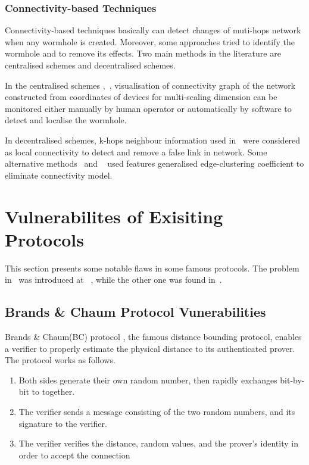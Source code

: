 \subsubsection*{Connectivity-based Techniques}

Connectivity-based techniques basically can detect changes of muti-hops network when any wormhole is created. Moreover, some approaches tried to identify the wormhole and to remove its effects. Two main methods in the literature are centralised schemes and decentralised schemes. 

In the centralised schemes \cite{RuiZhang2010},~\cite{WeichaoWang2007}, visualisation of connectivity graph of the network constructed from coordinates of devices for multi-scaling dimension can be monitored either manually by human operator or automatically by software to detect and localise the wormhole. 

In decentralised schemes, k-hops neighbour information used in~\cite{RiteshMaheshwari}\cite{4699583} were considered as local connectivity to detect and remove a false link in network. Some alternative methods~\cite{RiteshMaheshwari} and ~\cite{5993472} used features generalised edge-clustering coefficient to eliminate connectivity model.

\section{Vulnerabilites of Exisiting Protocols}

This section presents some notable flaws in some famous protocols. The problem in~\cite{Brands:1994aa} was introduced at ~\cite{6234408}, while the other one was found in~\cite{lin2006}. 

\subsection{Brands \& Chaum Protocol Vunerabilities}

Brands \& Chaum(BC) protocol \cite{Brands:1994aa}, the famous distance bounding protocol, enables a verifier to properly estimate the physical distance to its authenticated prover. The protocol works as follows.
\begin{enumerate}
\item Both sides generate their own random number, then rapidly exchanges bit-by-bit to together.
\item The verifier sends a message consisting of the two random numbers, and its signature to the verifier. 
\item The verifier verifies the distance, random values, and the prover's identity in order to accept the connection
\end{enumerate}

